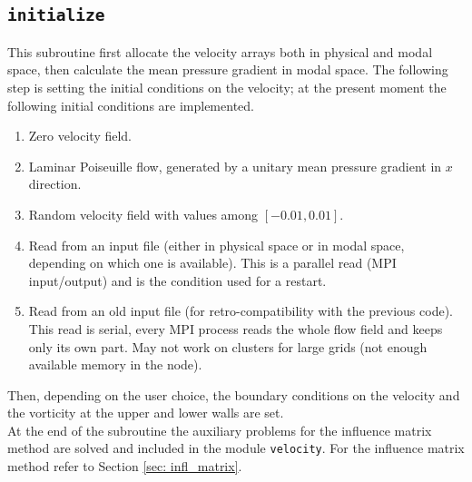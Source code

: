 \subsection{\texttt{initialize}}
This subroutine first allocate the velocity arrays both in physical and modal space, then calculate the mean pressure gradient in modal space. 
The following step is setting the initial conditions on the velocity; at the present moment the following initial conditions are implemented.
\begin{enumerate}
\item Zero velocity field.
\item Laminar Poiseuille flow, generated by a unitary mean pressure gradient in $x$ direction.
\item Random velocity field with values among $[-0.01,0.01]$.
\item Read from an input file (either in physical space or in modal space, depending on which one is available). This is a parallel read (MPI input/output) and is the condition used for a restart.
\item Read from an old input file (for retro-compatibility with the previous code).  This read is serial, every MPI process reads the whole flow field and keeps only its own part. May not work on clusters for large grids (not enough available memory in the node).
\end{enumerate}
Then, depending on the user choice, the boundary conditions on the velocity and the vorticity at the upper and lower walls are set.\\
At the end of the subroutine the auxiliary problems for the influence matrix method are solved and included in the module \texttt{velocity}. For the influence matrix method refer to Section \ref{sec: infl_matrix}.

